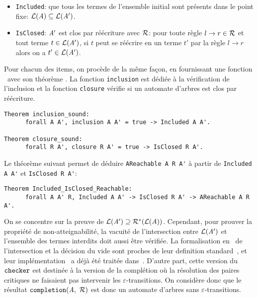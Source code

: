 \begin{itemize}
\item \lstinline!Included!: que tous les termes de l'ensemble initial sont présents  dans le point fixe: $\mathcal{L}(\mathit A) \subseteq \mathcal{L}(\mathit A')$.

\item \lstinline!IsClosed!: $\mathit A'$ est clos par réécriture avec $\mathcal R$: pour toute règle $l \rightarrow
  r \in \mathcal R$ et tout terme $t \in \mathcal{L}(\mathit A')$, si $t$ peut se réécrire en un terme $t'$ par la règle
  $l \rightarrow r$ alors on a $t' \in \mathcal{L}(\mathit A')$. 
\end{itemize}
Pour chacun des items, on procède de la même façon, en fournissant une fonction \coq\ avec son théorème \coq.
La fonction \texttt{inclusion} est dédiée à la vérification de l'inclusion et la fonction \texttt{closure}
vérifie si un automate d'arbres est clos par réécriture. 
\begin{lstlisting}
Theorem inclusion_sound:
      forall A A', inclusion A A' = true -> Included A A'.

Theorem closure_sound:
      forall R A', closure R A' = true -> IsClosed R A'.
\end{lstlisting}

Le théorème suivant permet de déduire \lstinline!AReachable A R A'! à partir de \lstinline!Included A A'! et \lstinline!IsClosed R A'!:
\begin{lstlisting}
Theorem Included_IsClosed_Reachable:
      forall A A' R, Included A A' -> IsClosed R A' -> AReachable A R A'.
\end{lstlisting}


On se concentre sur la preuve de  $\mathcal{L}(\mathit A')\supseteq \mathcal R^*(\mathcal{L}(\mathit A))$. 
Cependant, pour prouver la propriété de non-atteignabilité, la vacuité de l'intersection
entre $\mathcal{L}(\mathit A')$ et l'ensemble des termes interdits doit aussi être vérifiée.
La formalisation en \coq\ de l'intersection et la décision du vide sont proches
de leur definition standard~\cite{TATA}, et leur implémentation
\coq\ a déjà été traitée dans~\cite{RivalGL-TPHOL01}.
D'autre part, cette version du $\mathtt{checker}$ est destinée à la version de la complétion où 
la résolution des paires critiques ne faisaient pas intervenir les $\varepsilon$-transitions.
On considère donc que le résultat $\mathtt{completion}(\mathit A,\ \mathcal R)$ est donc un automate d'arbres 
sans $\varepsilon$-transitions. 

